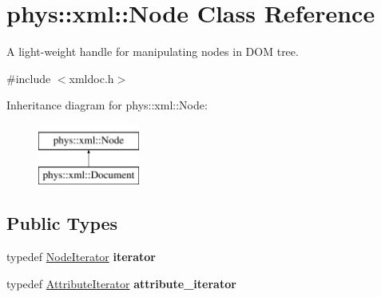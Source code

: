 \hypertarget{classphys_1_1xml_1_1Node}{
\section{phys::xml::Node Class Reference}
\label{d7/d0a/classphys_1_1xml_1_1Node}
}


A light-\/weight handle for manipulating nodes in DOM tree.  




{\ttfamily \#include $<$xmldoc.h$>$}

Inheritance diagram for phys::xml::Node:\begin{figure}[H]
\begin{center}
\leavevmode
\includegraphics[height=2.000000cm]{d7/d0a/classphys_1_1xml_1_1Node}
\end{center}
\end{figure}
\subsection*{Public Types}
\begin{DoxyCompactItemize}
\item 
\hypertarget{classphys_1_1xml_1_1Node_a0da067636c89829a111dd51037cea6b3}{
typedef \hyperlink{classphys_1_1xml_1_1NodeIterator}{NodeIterator} {\bfseries iterator}}
\label{d7/d0a/classphys_1_1xml_1_1Node_a0da067636c89829a111dd51037cea6b3}

\item 
\hypertarget{classphys_1_1xml_1_1Node_a3b37ee9a716fc3a6cd92733ccf28f26a}{
typedef \hyperlink{classphys_1_1xml_1_1AttributeIterator}{AttributeIterator} {\bfseries attribute\_\-iterator}}
\label{d7/d0a/classphys_1_1xml_1_1Node_a3b37ee9a716fc3a6cd92733ccf28f26a}

\end{DoxyCompactItemize}
